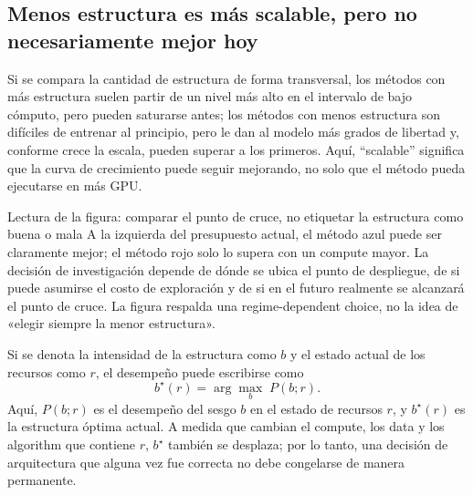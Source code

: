 
\subsection{Menos estructura es más scalable, pero no necesariamente mejor hoy}

Si se compara la cantidad de estructura de forma transversal, los métodos con más estructura suelen partir de un nivel más alto en el intervalo de bajo cómputo, pero pueden saturarse antes; los métodos con menos estructura son difíciles de entrenar al principio, pero le dan al modelo más grados de libertad y, conforme crece la escala, pueden superar a los primeros. Aquí, ``scalable'' significa que la curva de crecimiento puede seguir mejorando, no solo que el método pueda ejecutarse en más GPU.


\begin{knowledgebox}{Lectura de la figura: comparar el punto de cruce, no etiquetar la estructura como buena o mala}
A la izquierda del presupuesto actual, el método azul puede ser claramente mejor; el método rojo solo lo supera con un compute mayor. La decisión de investigación depende de dónde se ubica el punto de despliegue, de si puede asumirse el costo de exploración y de si en el futuro realmente se alcanzará el punto de cruce. La figura respalda una regime-dependent choice, no la idea de «elegir siempre la menor estructura».
\end{knowledgebox}



Si se denota la intensidad de la estructura como $b$ y el estado actual de los recursos como $r$, el desempeño puede escribirse como
\[
b^{\star}(r)=\arg\max_b\; P(b;r).
\]
Aquí, $P(b;r)$ es el desempeño del sesgo $b$ en el estado de recursos $r$, y $b^{\star}(r)$ es la estructura óptima actual. A medida que cambian el compute, los data y los algorithm que contiene $r$, $b^{\star}$ también se desplaza; por lo tanto, una decisión de arquitectura que alguna vez fue correcta no debe congelarse de manera permanente.

